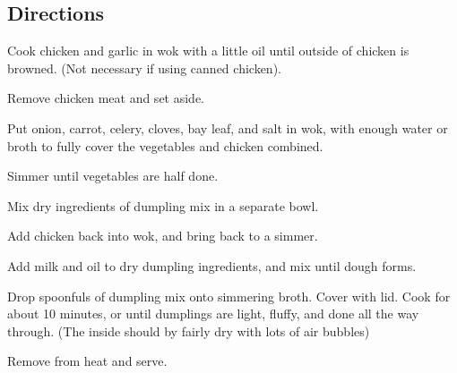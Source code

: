 \documentclass{article}
\newcounter{qcounter}
\begin{document}
\subsection*{Directions}
\begin{list}{:~}{}
\item Cook chicken and garlic in wok with a little oil until outside of chicken is browned. (Not necessary if using canned chicken).
\item Remove chicken meat and set aside.
\item Put onion, carrot, celery, cloves, bay leaf, and salt in wok, with enough water or broth to fully cover the vegetables and chicken combined.
\item Simmer until vegetables are half done.
\item Mix dry ingredients of dumpling mix in a separate bowl.
\item Add chicken back into wok, and bring back to a simmer.
\item Add milk and oil to dry dumpling ingredients, and mix until dough forms.
\item Drop spoonfuls of dumpling mix onto simmering broth.  Cover with lid. Cook for about 10 minutes, or until dumplings are light, fluffy, and done all the way through. (The inside should by fairly dry with lots of air bubbles)
\item Remove from heat and serve.
\end{list}
\end{document}
